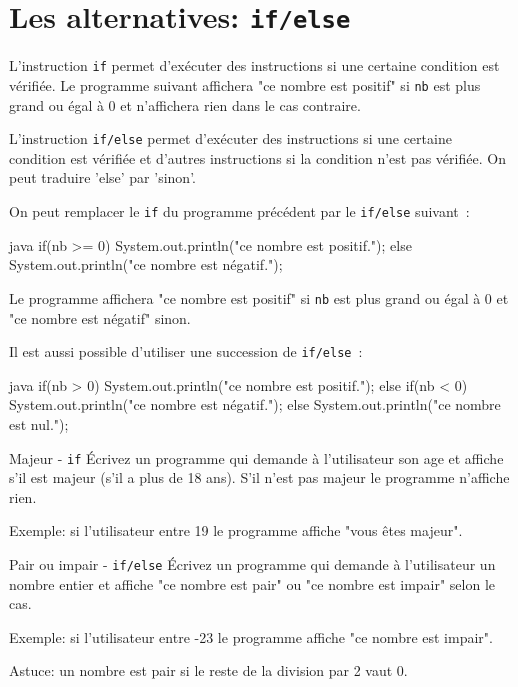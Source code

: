 \documentclass[a4paper,11pt]{style-esi/td}
\begin{document}


\section{Les alternatives: \texttt{if/else}}

L'instruction \texttt{if} permet d'exécuter des instructions si une certaine condition est vérifiée.
Le programme suivant affichera "ce nombre est positif"
si \texttt{nb} est plus grand ou égal à 0 et n'affichera rien dans le cas contraire.


L'instruction \texttt{if/else} permet d'exécuter des instructions si une certaine condition est vérifiée
et d'autres instructions si la condition n'est pas vérifiée. On peut traduire 'else' par 'sinon'.

On peut remplacer le \texttt{if} du programme précédent par le \texttt{if/else} suivant~:

\begin{Code}[basicstyle=\small\vtt]{java}
	if(nb >= 0) {
		System.out.println("ce nombre est positif.");
	} else {
		System.out.println("ce nombre est négatif.");
	}
\end{Code}

Le programme affichera "ce nombre est positif"
si \texttt{nb} est plus grand ou égal à 0 et "ce nombre est négatif" sinon.


Il est aussi possible d'utiliser une succession de \texttt{if/else}~:

\begin{Code}[basicstyle=\small\vtt]{java}
	if(nb > 0) {
		System.out.println("ce nombre est positif.");
	} else if(nb < 0) {
		System.out.println("ce nombre est négatif.");
	} else {
		System.out.println("ce nombre est nul.");
	}
\end{Code}


\begin{Exercice}{Majeur - \texttt{if}}
	\'Ecrivez un programme qui demande à l'utilisateur
	son age et affiche s'il est majeur (s'il a plus de 18 ans).
	S'il n'est pas majeur le programme n'affiche rien.

	Exemple: si l'utilisateur entre 19 le programme affiche "vous êtes majeur".
\end{Exercice}

\begin{Exercice}{Pair ou impair - \texttt{if/else}}
	\'Ecrivez un programme qui demande à l'utilisateur
	un nombre entier et affiche "ce nombre est pair" ou "ce nombre est impair" selon le cas.

	Exemple: si l'utilisateur entre -23 le programme affiche "ce nombre est impair".

	Astuce: un nombre est pair si le reste de la division par 2 vaut 0.
\end{Exercice}
\end{document}
